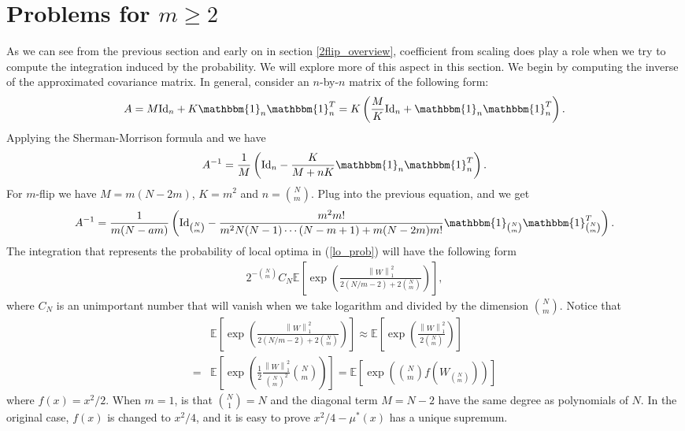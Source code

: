\documentclass[10pt]{article}
\newcommand{\e}{\mathbb{E}}
\newcommand{\norm}[1]{\left\lVert#1\right\rVert}
\newenvironment{Proof of lemma}{\noindent{\bf Proof of Lemma}}{\hfill$\Box$\newline}
\newenvironment{Proof of claim}{\noindent{\bf Proof of claim}}{\hfill$\Box$\newline}
\newenvironment{Proof of theorem}{\noindent{\bf Proof of Theorem}}{\hfill\scriptsize{$\Box$}\newline}
\newenvironment{Proof of theorems}{\noindent{\bf Proof of Theorems}}{\hfill$\Box$\newline}
\newenvironment{Proof of proposition}{\noindent{\bf Proof of Proposition}}{\hfill$\Box$\newline}
\newenvironment{Proof of propositions}{\noindent{\bf Proof of Propositions}}{\hfill$\Box$\newline}
\newenvironment{Proof of exercise}{\noindent{\it Proof of Exercise:}}{\hfill$\Box$}
\numberwithin{equation}{section}
\begin{document}
\section{Problems for $m \geq 2$}
As we can see from the previous section and early on in section \ref{2flip_overview}, coefficient from scaling does play a role when we try to compute the integration induced by the probability. We will explore more of this aspect in this section. We begin by computing the inverse of the approximated covariance matrix. In general, consider an $n$-by-$n$ matrix of the following form:
\begin{align}
    A = M\text{Id}_n + K\mathbbm{1}_{n}\mathbbm{1}^T_{n} = K\left(\frac{M}{K}\text{Id}_n+\mathbbm{1}_{n}\mathbbm{1}^T_{n}\right).
\end{align}
Applying the Sherman-Morrison formula and we have
\begin{align}
    A^{-1} = \frac{1}{M}\left(\text{Id}_n-\frac{K}{M+nK}\mathbbm{1}_{n}\mathbbm{1}^T_{n}\right).
\end{align}
For $m$-flip we have $M = m(N-2m)$, $K = m^2$ and $n = \binom{N}{m}$. Plug into the previous equation, and we get
\begin{align}
    A^{-1} = \frac{1}{m(N-am)}\left(\text{Id}_{\binom{N}{m}} - \frac{m^2m!}{m^2N(N-1)\cdots(N-m+1)+m(N-2m)m!}\mathbbm{1}_{\binom{N}{m}}\mathbbm{1}^T_{\binom{N}{m}}\right).
\end{align}
The integration that represents the probability of local optima in (\ref{lo_prob}) will have the following form
\begin{align}
    2^{-\binom{N}{m}}C_N\e \left[\exp\left(\frac{\norm{W}_1^2}{2(N/m-2)+2\binom{N}{m}}\right)\right],
\end{align}
where $C_N$ is an unimportant number that will vanish when we take logarithm and divided by the dimension $\binom{N}{m}$. Notice that
\begin{align}
    &\e \left[\exp\left(\frac{\norm{W}_1^2}{2(N/m-2)+2\binom{N}{m}}\right)\right] \approx \e \left[\exp\left(\frac{\norm{W}_1^2}{2\binom{N}{m}}\right)\right]\nonumber \\
    =&\e \left[\exp\left(\frac{1}{2}\frac{\norm{W}_1^2}{\binom{N}{m}^2}\binom{N}{m}\right)\right] = \e \left[\exp \left(\binom{N}{m}f(W_{\binom{N}{m}})\right)\right]
\end{align}
where $f(x) = x^2/2$. When $m=1$, is that $\binom{N}{1} = N$ and the diagonal term $M = N-2$ have the same degree as polynomials of $N$. In the original case, $f(x)$ is changed to $x^2/4$, and it is easy to prove $x^2/4 - \mu^*(x)$ has a unique supremum.
\end{document}
